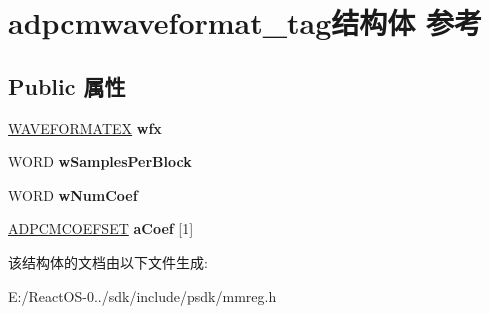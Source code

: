 \hypertarget{structadpcmwaveformat__tag}{}\section{adpcmwaveformat\+\_\+tag结构体 参考}
\label{structadpcmwaveformat__tag}
\subsection*{Public 属性}
\begin{DoxyCompactItemize}
\item 
\mbox{\label{structadpcmwaveformat__tag_a3a13fe0d64e622df0bd62bf2195e90d1}} 
\hyperlink{struct_w_a_v_e_f_o_r_m_a_t_e_x}{W\+A\+V\+E\+F\+O\+R\+M\+A\+T\+EX} {\bfseries wfx}
\item 
\mbox{\label{structadpcmwaveformat__tag_a4b58537cf757d9add119f86ab9310cbb}} 
W\+O\+RD {\bfseries w\+Samples\+Per\+Block}
\item 
\mbox{\label{structadpcmwaveformat__tag_aca51197b791a4b63bf34d35679554fd2}} 
W\+O\+RD {\bfseries w\+Num\+Coef}
\item 
\mbox{\label{structadpcmwaveformat__tag_a335b7cb362d4796b1ed3bd77eb837148}} 
\hyperlink{structadpcmcoef__tag}{A\+D\+P\+C\+M\+C\+O\+E\+F\+S\+ET} {\bfseries a\+Coef} \mbox{[}1\mbox{]}
\end{DoxyCompactItemize}


该结构体的文档由以下文件生成\+:\begin{DoxyCompactItemize}
\item 
E\+:/\+React\+O\+S-\/0../sdk/include/psdk/mmreg.\+h\end{DoxyCompactItemize}
